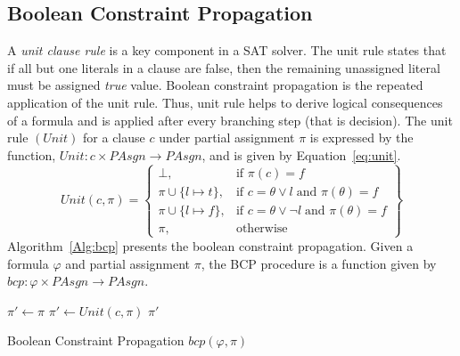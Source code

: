 \subsection{Boolean Constraint Propagation}
%
A \emph{unit clause rule} is a key component in a SAT solver. The unit rule
states that if all but one literals in a clause are false, then the remaining 
unassigned literal must be assigned \emph{true} value.  Boolean constraint
propagation is the repeated application of the unit rule.  Thus, unit rule helps
to derive logical consequences of a formula and is applied after every branching
step (that is decision).  The unit rule $(Unit)$ for a clause $c$ under partial
assignment $\pi$ is expressed by the function, $Unit \colon c \times PAsgn \rightarrow PAsgn$, 
and is given by Equation~\ref{eq:unit}.
%
\begin{equation}\label{eq:unit}
  Unit(c, \pi) = \left\{\begin{array}{lr}
    \bot, & \text{if } \pi(c)=f \\
    \pi \cup \{l \mapsto t\}, & \text{if } c=\theta \vee l\; \text{and }
    \pi(\theta)=f \\ 
    \pi \cup \{l \mapsto f\}, & \text{if } c=\theta \vee \neg l\; \text{and }
    \pi(\theta)=f \\ 
    \pi, & \text{otherwise}
\end{array}\right\}
\end{equation}
%
Algorithm~\ref{Alg:bcp} presents the boolean constraint propagation. Given a 
formula $\varphi$ and partial assignment $\pi$, the BCP procedure is a function
given by $bcp \colon \varphi \times PAsgn \rightarrow PAsgn$. 
%
\begin{algorithm2e}[t]
\DontPrintSemicolon
{}
\begin{small}
   {
    $\pi' \leftarrow \pi$ \;
     {
      $\pi' \leftarrow Unit(c,\pi)$ \; 
    }
  }
  \return $\pi'$ \;
\end{small}
\caption{Boolean Constraint Propagation $bcp(\varphi, \pi)$
  \label{Alg:bcp}}
\end{algorithm2e}
